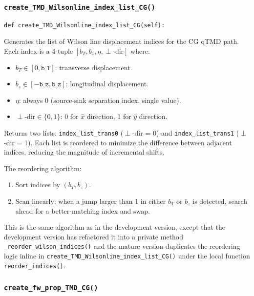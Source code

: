 \documentclass[11pt]{article}
\begin{document}
\subsubsection{\texttt{create\_TMD\_Wilsonline\_index\_list\_CG()}}

\begin{lstlisting}
def create_TMD_Wilsonline_index_list_CG(self):
\end{lstlisting}

Generates the list of Wilson line displacement indices for the CG qTMD path. Each index is a 4-tuple $[b_T, b_z, \eta, \perp\text{-dir}]$ where:
\begin{itemize}
    \item $b_T \in [0, \texttt{b\_T}]$: transverse displacement.
    \item $b_z \in [-\texttt{b\_z}, \texttt{b\_z}]$: longitudinal displacement.
    \item $\eta$: always 0 (source-sink separation index, single value).
    \item $\perp\text{-dir} \in \{0, 1\}$: 0 for $\hat{x}$ direction, 1 for $\hat{y}$ direction.
\end{itemize}

Returns two lists: \texttt{index\_list\_trans0} ($\perp$-dir = 0) and \texttt{index\_list\_trans1} ($\perp$-dir = 1). Each list is reordered to minimize the difference between adjacent indices, reducing the magnitude of incremental shifts.

The reordering algorithm:
\begin{enumerate}
    \item Sort indices by $(b_T, b_z)$.
    \item Scan linearly; when a jump larger than 1 in either $b_T$ or $b_z$ is detected, search ahead for a better-matching index and swap.
\end{enumerate}

This is the same algorithm as in the development version, except that the development version has refactored it into a private method \texttt{\_reorder\_wilson\_indices()} and the mature version duplicates the reordering logic inline in \texttt{create\_TMD\_Wilsonline\_index\_list\_CG()} under the local function \texttt{reorder\_indices()}.

\subsubsection{\texttt{create\_fw\_prop\_TMD\_CG()}}
\end{document}

